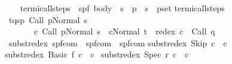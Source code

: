 \begin{isabellebody}
\ \ \isamarkupfalse%
\isanewline
{}\isamarkupfalse%
%
\endisatagproof
{\isafoldproof}%
%
\isadelimproof
\isanewline
%
\endisadelimproof
\isanewline
\isanewline
{}\isamarkupfalse%
\isanewline
\ termi{\isacharunderscore}call{\isacharunderscore}steps\ {\isacharcolon}{\isacharcolon}\ {\isachardoublequoteopen}{\isacharparenleft}{\isacharprime}s{\isacharcomma}{\isacharprime}p{\isacharcomma}{\isacharprime}f{\isacharparenright}\ body\ {\isasymRightarrow}\ {\isacharparenleft}{\isacharparenleft}{\isacharprime}s\ {\isasymtimes}\ {\isacharprime}p{\isacharparenright}\ {\isasymtimes}\ {\isacharparenleft}{\isacharprime}s\ {\isasymtimes}\ {\isacharprime}p{\isacharparenright}{\isacharparenright}set{\isachardoublequoteclose}\isanewline
{}\isanewline
{\isachardoublequoteopen}termi{\isacharunderscore}call{\isacharunderscore}steps\ {\isasymGamma}\ {\isacharequal}\isanewline
\ {\isacharbraceleft}{\isacharparenleft}{\isacharparenleft}t{\isacharcomma}q{\isacharparenright}{\isacharcomma}{\isacharparenleft}s{\isacharcomma}p{\isacharparenright}{\isacharparenright}{\isachardot}\ {\isasymGamma}{\isasymturnstile}Call\ p{\isasymdown}Normal\ s\ {\isasymand}\ \isanewline
\ \ \ \ \ \ \ {\isacharparenleft}{\isasymexists}c{\isachardot}\ {\isasymGamma}{\isasymturnstile}{\isacharparenleft}Call\ p{\isacharcomma}Normal\ s{\isacharparenright}\ {\isasymrightarrow}\isactrlsup {\isacharplus}\ {\isacharparenleft}c{\isacharcomma}Normal\ t{\isacharparenright}\ {\isasymand}\ redex\ c\ {\isacharequal}\ Call\ q{\isacharparenright}{\isacharbraceright}{\isachardoublequoteclose}\isanewline
\isanewline
\isanewline
{}\isamarkupfalse%
\ subst{\isacharunderscore}redex{\isacharcolon}{\isacharcolon}\ {\isachardoublequoteopen}{\isacharparenleft}{\isacharprime}s{\isacharcomma}{\isacharprime}p{\isacharcomma}{\isacharprime}f{\isacharparenright}com\ {\isasymRightarrow}\ {\isacharparenleft}{\isacharprime}s{\isacharcomma}{\isacharprime}p{\isacharcomma}{\isacharprime}f{\isacharparenright}com\ {\isasymRightarrow}\ {\isacharparenleft}{\isacharprime}s{\isacharcomma}{\isacharprime}p{\isacharcomma}{\isacharprime}f{\isacharparenright}com{\isachardoublequoteclose}\isanewline
{}\isanewline
{\isachardoublequoteopen}subst{\isacharunderscore}redex\ Skip\ c\ {\isacharequal}\ c{\isachardoublequoteclose}\ {\isacharbar}\isanewline
{\isachardoublequoteopen}subst{\isacharunderscore}redex\ {\isacharparenleft}Basic\ f{\isacharparenright}\ c\ {\isacharequal}\ c{\isachardoublequoteclose}\ {\isacharbar}\isanewline
{\isachardoublequoteopen}subst{\isacharunderscore}redex\ {\isacharparenleft}Spec\ r{\isacharparenright}\ c\ {\isacharequal}\ c{\isachardoublequoteclose}\ {\isacharbar}\isanewline

\end{isabellebody}
